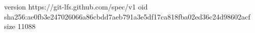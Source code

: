 version https://git-lfs.github.com/spec/v1
oid sha256:ae0fb3e247026066a86cbdd7aeb791a3e5df17ca818fba02ed36c24d98602acf
size 11088
